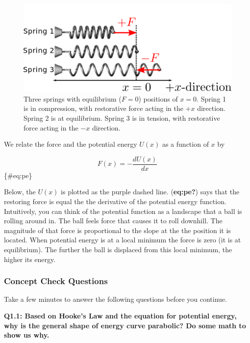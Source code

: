\documentclass{book}
\begin{document}
\begin{figure}
\hypertarget{fig:SpringSystem}{%
\centering
\includegraphics{images/figures/SpringSystem.png}
\caption{Three springs with equilibrium (\(F=0\)) positions of \(x=0\). Spring
1 is in compression, with restorative force acting in the \(+x\) direction.
Spring 2 is at equilibrium. Spring 3 is in tension, with restorative force
acting in the \(-x\) direction.}\label{fig:SpringSystem}
}
\end{figure}

We relate the force and the potential energy \(U(x)\) as a function of \(x\)
by

\begin{equation}  F(x) = - \frac{dU(x)}{dx} \end{equation}\{\#eq:pe\}

Below, the \(U(x)\) is plotted as the purple dashed line. (\textbf{eq:pe?})
says that the restoring force is equal the the derivative of the potential
energy function. Intuitively, you can think of the potential function as a
landscape that a ball is rolling around in. The ball feels force that causes
it to roll downhill. The magnitude of that force is proportional to the slope
at the the position it is located. When potential energy is at a local minimum
the force is zero (it is at equilibrium). The further the ball is displaced
from this local minimum, the higher its energy.

\hypertarget{concept-check-questions}{%
\subsubsection{Concept Check Questions}\label{concept-check-questions}}

Take a few minutes to answer the following questions before you continue.

\textbf{Q1.1: Based on Hooke's Law and the equation for potential energy, why
is the general shape of energy curve parabolic? Do some math to show us why.}
\end{document}
